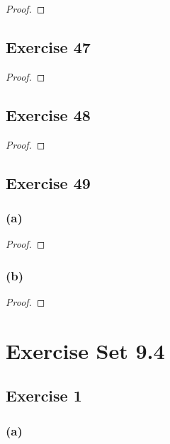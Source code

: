 \documentclass[14pt]{extarticle}
\begin{document}
\begin{proof}

\end{proof}

\subsection{Exercise 47}

\begin{proof}

\end{proof}

\subsection{Exercise 48}

\begin{proof}

\end{proof}

\subsection{Exercise 49}

\subsubsection{(a)}

\begin{proof}

\end{proof}

\subsubsection{(b)}

\begin{proof}

\end{proof}

\section{Exercise Set 9.4}

\subsection{Exercise 1}

\subsubsection{(a)}
\end{document}
